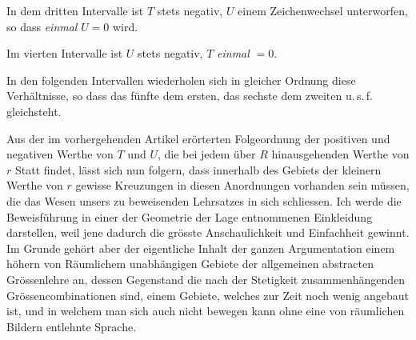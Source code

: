 In dem dritten Intervalle ist $T$ stets negativ, $U$ einem Zeichenwechsel unterworfen, so dass \emph{einmal} $U=0$ wird.

Im vierten Intervalle ist $U$ stets negativ, $T$ \emph{einmal} $=0$.

In den folgenden Intervallen wiederholen sich in gleicher Ordnung diese
Verhältnisse, so dass das fünfte dem ersten, das sechste dem zweiten u.\,s.\,f.
gleichsteht.

Aus der im vorhergehenden Artikel erörterten Folgeordnung der positiven
und negativen Werthe von $T$ und $U$, die bei jedem über $R$ hinausgehenden
Werthe von $r$ Statt findet, lässt sich nun folgern, dass innerhalb des Gebiets
der kleinern Werthe von $r$ gewisse Kreuzungen in diesen Anordnungen vorhanden
sein müssen, die das Wesen unsers zu beweisenden Lehrsatzes in sich schliessen.
Ich werde die Beweisführung in einer der Geometrie der Lage entnommenen Einkleidung darstellen, weil jene dadurch die grösste Anschaulichkeit und Einfachheit gewinnt. Im Grunde gehört aber der eigentliche Inhalt der ganzen Argumentation einem höhern von Räumlichem unabhängigen Gebiete der allgemeinen
abstracten Grössenlehre an, dessen Gegenstand die nach der Stetigkeit zusammenhängenden Grössencombinationen sind, einem Gebiete, welches zur Zeit noch
wenig angebaut ist, und in welchem man sich auch nicht bewegen kann ohne
eine von räumlichen Bildern entlehnte Sprache.

